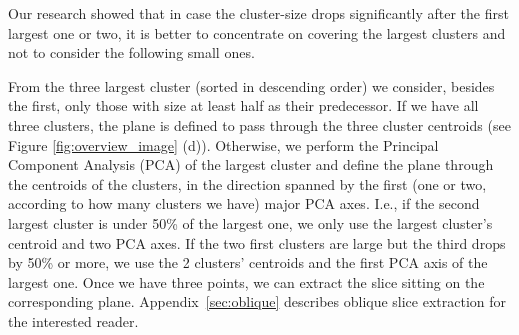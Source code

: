 Our research showed that in case the cluster-size drops significantly after the first largest one or two, it is better to concentrate on covering the largest clusters and not to consider the following small ones.

From the three largest cluster (sorted in descending order) we consider, besides the first, only those with size at least half as their predecessor. If we have all three clusters, the plane is defined to pass through the three cluster centroids (see Figure \ref{fig:overview_image} (d)). Otherwise, we perform the Principal Component Analysis (PCA) \cite{Jolliffe:2002} of the largest cluster and define the plane through the centroids of the clusters, in the direction spanned by the first (one or two, according to how many clusters we have) major PCA axes.
I.e., if the second largest cluster is under 50\% of the largest one, we only use the largest cluster's centroid and two PCA axes. If the two first clusters are large but the third drops by 50\% or more, we use the 2 clusters' centroids and the first PCA axis of the largest one.
Once we have three points, we can extract the slice sitting on the corresponding plane.
Appendix~\ref{sec:oblique} describes oblique slice extraction for the interested reader.
